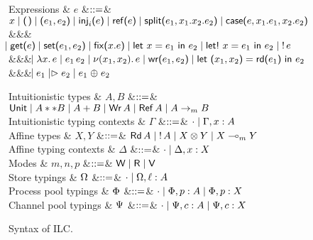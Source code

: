 \begin{figure*}[t]
  \begin{grammar}
    Expressions
    & $e$
        &$\mathrel{::=}$&
        $\eVar{x} \bnfalt \eUnit \bnfalt \ePair{e_1}{e_2} \bnfalt \eInj{i}{e}
    \bnfalt \eRef{e} \bnfalt \eSplit{e_1}{x_1}{x_2}{e_2} \bnfalt
    \eCase{e}{x_1}{e_1}{x_2}{e_2}$
    \\ &&& $\hspace{-1.02ex}\mathrel{\mid} \text{\textsf{get}}\textsf{(}{e}\textsf{)} \mathrel{\mid} \text{\textsf{set}}\textsf{(}{e_1},{e_2}\textsf{)} \mathrel{\mid} \text{\textsf{fix}}\textsf{(}{x}.{e}\textsf{)}
    \mathrel{\mid} \text{\textsf{let}}\ {x} = {e_1}\ \text{\textsf{in}}\ {e_2} \mathrel{\mid} \text{\textsf{let!}}\ {x} = {e_1}\ \text{\textsf{in}}\ {e_2} \mathrel{\mid} {!}\,{e}$
    \\ &&& $\hspace{-1.02ex}\mathrel{\mid} \lambda{x}.\,{e} \mathrel{\mid} e_1\,e_2 \mathrel{\mid} \nu(x_1,
      x_2).\,e \mathrel{\mid} \text{\textsf{wr}}\textsf{(}{e_1},{e_2}\textsf{)} \mathrel{\mid} \text{\textsf{let}}\ {\textsf{(}{x_1},{x_2}\textsf{)}} = {\text{\textsf{rd}}\textsf{(}{e_1}\textsf{)}}\ \text{\textsf{in}}\ {{e_2}}$
    \\ &&& $\hspace{-1.02ex}\mathrel{\mid} e_1 \mathrel{|\rhd} e_2 \mathrel{\mid} e_1 \mathrel{\oplus} e_2$
  \end{grammar}
  \begin{grammar}
    Intuitionistic types
    & $A,B$
    &$\mathrel{::=}$& $\text{\textsf{Unit}} \mathrel{\mid} {A} ** {B} \mathrel{\mid} {A} + {B} \mathrel{\mid}
    \text{\textsf{Wr}}\,A \mathrel{\mid} \text{\textsf{Ref}}\,A \mathrel{\mid} {A}\rightarrow_{\footnotesize m}{B}$
    \\
    Intuitionistic typing contexts
    & $\Gamma$
    &$\mathrel{::=}$& $\cdot \mathrel{\mid} \Gamma,x:A$
    \\
    Affine types
    & $X,Y$
    &$\mathrel{::=}$& $\text{\textsf{Rd}}\,A \mathrel{\mid} {!}\,{A} \mathrel{\mid} {X}\otimes{Y} \mathrel{\mid}
    {X}\multimap_{\footnotesize m}{Y}$
    \\
    Affine typing contexts
    & $\Delta$
    &$\mathrel{::=}$& $\cdot \mathrel{\mid} \Delta,x:X$
    \\
    Modes & $m,n,p$ &$\mathrel{::=}$& $\textsf{W} \mathrel{\mid} \textsf{R} \mathrel{\mid} \textsf{V}$    
    \\[2mm]
    Store typings
    & $\Omega$
    &$\mathrel{::=}$& $\cdot \mathrel{\mid} \Omega,\ell:A$
    \\
    Process pool typings
    & $\Phi$
    &$\mathrel{::=}$& $\cdot \mathrel{\mid} \Phi,p:A \mathrel{\mid} \Phi,p:X$
    \\
    Channel pool typings
    & $\Psi$
    &$\mathrel{::=}$& $\cdot \mathrel{\mid} \Psi,c:A \mathrel{\mid} \Psi,c:X$
  \end{grammar}
  \caption{Syntax of ILC.}
  \label{fig:ilc-syntax}
\end{figure*}
